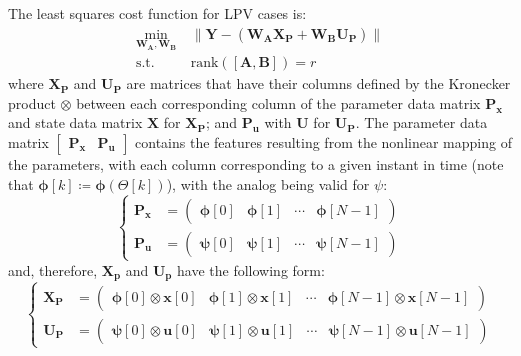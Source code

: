 The least squares cost function for LPV cases is:
\begin{equation} \label{eqn:procustes}
\begin{aligned}
    \min_{\mathbf{W_A},\mathbf{W_B}} ~& \| \mathbf{Y} - (\mathbf{W_A}\mathbf{X_P} + \mathbf{W_B}\mathbf{U_P})\|\\
    \text{s.t.} ~~& \text{rank}(\left[\mathbf{A},\mathbf{B}\right]) = r
\end{aligned}
\end{equation}
where $\mathbf{X_P}$ and $\mathbf{U_P}$ are matrices that have their columns defined by the Kronecker product $\otimes$ between each corresponding column of the parameter data matrix $\mathbf{P_x}$ and state data matrix $\mathbf{X}$ for $\mathbf{X_P}$; and $\mathbf{P_u}$ with $\mathbf{U}$ for $\mathbf{U_P}$.
%
The parameter data matrix $\begin{bmatrix}\mathbf{P_x} & \mathbf{P_u}\end{bmatrix}$ contains the features resulting from the nonlinear mapping of the parameters, with each column corresponding to a given instant in time (note that $\boldsymbol{\phi}[k] \coloneqq \boldsymbol{\phi}(\Theta [k])$), with the analog being valid for $\psi$:
\begin{equation} \label{eq:def:Px-Pu}
 \left \{ 
\begin{aligned}
  \mathbf{P_x} &=
    \begin{pmatrix}
        \boldsymbol{\phi}[0] & \boldsymbol{\phi}[1] & \cdots & \boldsymbol{\phi}[N-1]
    \end{pmatrix}\\
     \mathbf{P_u} &=
    \begin{pmatrix}
        \boldsymbol{\psi}[0] & \boldsymbol{\psi}[1] & \cdots & \boldsymbol{\psi}[N-1]
    \end{pmatrix}
\end{aligned} \right .
\end{equation}
and, therefore, $\mathbf{X_p}$ and $\mathbf{U_p}$ have the following form:
\begin{equation} \label{eq:def:Xp-Up}
 \left \{ 
\begin{aligned}
    \mathbf{X_P} &=
    \begin{pmatrix}
        \boldsymbol{\phi}[0] \otimes \mathbf{x}[0] & \boldsymbol{\phi}[1] \otimes \mathbf{x}[1] & \cdots & \boldsymbol{\phi}[N-1] \otimes \mathbf{x}[N-1]
    \end{pmatrix}\\
     \mathbf{U_P} &=
    \begin{pmatrix}
        \boldsymbol{\psi}[0] \otimes \mathbf{u}[0] & \boldsymbol{\psi}[1] \otimes \mathbf{u}[1] & \cdots & \boldsymbol{\psi}[N-1]\otimes \mathbf{u}[N-1]
    \end{pmatrix}
\end{aligned} \right .
\end{equation}


